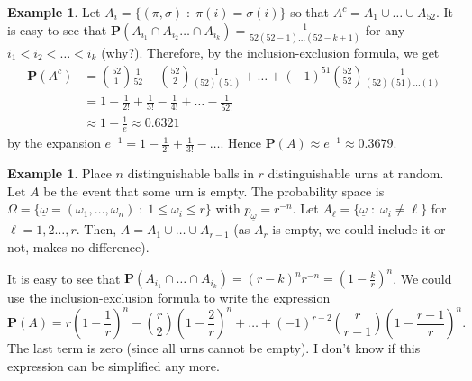 \documentclass[preprint,  11pt]{amsart}
\def\ome{\omega}
\theoremstyle{plain} %
\theoremstyle{definition} %
\newtheorem{example}[theorem]{Example}
\begin{document}
{{{{{{{{{{{{{\begin{example}
Let $A_{i}=\{(\pi,{\sigma}){\; : \;} \pi(i)={\sigma}(i)\}$ so that $A^{c}=A_{1}\cup \ldots \cup A_{52}$. It is easy to see that $\mathbf{P}(A_{i_{1}}\cap A_{i_{2}}\ldots \cap A_{i_{k}})=\frac{1}{52(52-1)\ldots (52-k+1)}$ for any $i_{1}<i_{2}<\ldots <i_{k}$ (why?). Therefore, by the inclusion-exclusion formula, we get
\begin{align*}
\mathbf{P}(A^{c}) &=  \binom{52}{1}\frac{1}{52}-\binom{52}{2}\frac{1}{(52)(51)} +  \ldots + (-1)^{51} \binom{52}{52}\frac{1}{(52)(51)\ldots (1)}\\
&= 1-\frac{1}{2!}+\frac{1}{3!}-\frac{1}{4!}+\ldots -\frac{1}{52!} \\
&\approx 1-\frac{1}{e} \approx 0.6321
\end{align*}
by the expansion $e^{-1}=1-\frac{1}{2!}+\frac{1}{3!}-\ldots $. Hence $\mathbf{P}(A)\approx e^{-1}\approx 0.3679$.
\end{example}
\begin{example}\label{eg:probofemptyurn2} Place $n$ distinguishable balls in $r$ distinguishable urns at random. Let $A$ be the event that some urn is empty. The probability space is $\Omega=\{\underline{\ome}=(\omega_{1},\ldots,\omega_{n}){\; : \;} 1\le \omega_{i}\le r\}$ with $p_{\underline{\ome}}=r^{-n}$. Let $A_{\ell}=\{\underline{\ome}{\; : \;} \omega_{i}\not=\ell\}$ for $\ell=1,2\ldots ,r$. Then, $A=A_{1}\cup \ldots \cup A_{r-1}$ (as $A_{r}$ is empty, we could include it or not, makes no difference).

It is easy to see that $\mathbf{P}(A_{i_{1}}\cap \ldots \cap A_{i_{k}})=(r-k)^{n}r^{-n}=(1-\frac{k}{r})^{n}$. We could use the inclusion-exclusion formula to write the expression
$$
\mathbf{P}(A)=r\left(1-\frac{1}{r}\right)^{n}-\binom{r}{2}\left(1-\frac{2}{r}\right)^{n}+\ldots +(-1)^{r-2}\binom{r}{r-1}\left(1-\frac{r-1}{r}\right)^{n}.
$$
The last term is zero (since all urns cannot be empty). I don't know if this expression can be simplified any more.
\end{example}

}}}}}}}}}}}}}
\end{document}
